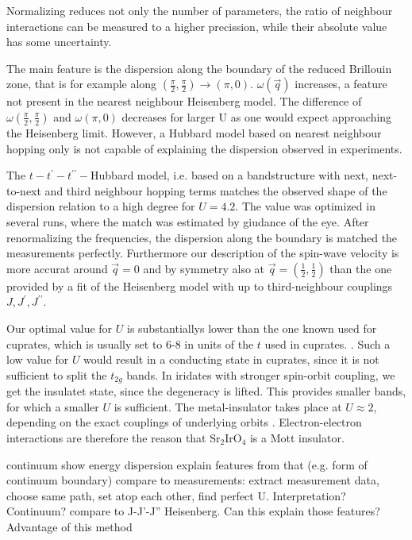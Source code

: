\documentclass[a4paper,10pt]{report}
\begin{document}
Normalizing reduces not only the number of parameters, the ratio of neighbour interactions can be measured to a higher precission, while 
their absolute value has some uncertainty.




The main feature is the dispersion along the boundary of the reduced Brillouin zone, that is for example along $(\frac{\pi}2,\frac{\pi}2) \rightarrow (\pi,0)$.
$\omega(\vec q)$ increases, a feature not present in the nearest neighbour Heisenberg model. 
The difference of $\omega(\frac{\pi}2,\frac{\pi}2)$ and $\omega(\pi,0)$ decreases for larger U as one would expect approaching the Heisenberg limit.
However, a Hubbard model based on nearest neighbour hopping only is not capable of explaining the dispersion observed in experiments.


The $t-t^{\prime}-t^{\prime \prime}-$Hubbard model, 
i.e. based on a bandstructure with next, next-to-next and third neighbour hopping terms 
matches the observed shape of the dispersion relation to a high degree for $U=4.2$.
The value was optimized in several runs, where the match was estimated by giudance of the eye.
After renormalizing the frequencies, the dispersion along the boundary is matched the measurements perfectly.
Furthermore our description of the spin-wave velocity is more accurat around $\vec q = 0$ and by symmetry also at $\vec q = (\frac12,\frac12)$ than the one
provided by a fit of the Heisenberg model with up to third-neighbour couplings $J,J^{\prime},J^{\prime \prime}$. 

Our optimal value for $U$ is substantiallys lower than the one known used for cuprates, which is usually set to 6-8 in units of the $t$ used in cuprates. 
.
Such a low value for $U$ would result in a conducting state in cuprates, since it is not sufficient to split the $t_{2g}$ bands. 
In iridates with stronger spin-orbit coupling, we get the insulatet state, since the degeneracy is lifted.
This provides smaller bands, for which a smaller $U$ is sufficient.
The metal-insulator takes place at $U \approx 2$, depending on the exact couplings of underlying orbits \cite{PhysRevB.88.035111}.
Electron-electron interactions are therefore the reason that Sr$_2$IrO$_4$ is a Mott insulator. 


continuum
show energy dispersion
explain features from that (e.g. form of continuum boundary)
compare to measurements: extract measurement data, choose same path, set atop each other, find perfect U. Interpretation? Continuum?
compare to J-J'-J'' Heisenberg. Can this explain those features? Advantage of this method
\end{document}
